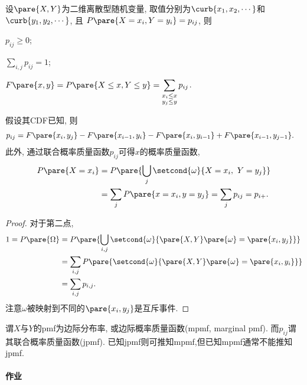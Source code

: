 \documentclass[../Statistics.tex]{subfiles}
\begin{document}
\begin{sample}
    \begin{ex}
        设$\pare{X,Y}$为二维离散型随机变量, 取值分别为$\curb{x_1,x_2,\cdots}$和$\curb{y_1,y_2,\cdots}$, 且
        $P\pare{X=x_i,Y=y_i} = p_{ij}$, 则
        \begin{cenum}
            \item $p_{ij} \ge 0$;
            \item $\displaystyle \sum_{i,j} p_{ij} = 1$;
            \item $F\pare{x,y} = P\pare{X\le x, Y\le y} = \displaystyle \sum_{\substack{x_i\le x\\ y_j\le y}} p_{ij}$.
        \end{cenum}
        假设其CDF已知, 则
        \begin{align*}
            p_{ij} &= F\pare{x_i, y_j} - F\pare{x_{i-1},y_i} - F\pare{x_i, y_{i-1}} + F\pare{x_{i-1},y_{j-1}}.
        \end{align*}
        此外, 通过联合概率质量函数$p_{ij}$可得$x$的概率质量函数,
        \begin{align*}
            P\pare{X=x_i} &= P\pare{\bigcup_{j} \setcond{\omega}{X = x_i,\ Y = y_j}} \\
            &= \sum_j P\pare{x = x_i, y = y_j} = \sum_j p_{ij} = p_{i+}.
        \end{align*}
    \end{ex}
    \begin{proof}
        对于第二点,
        \begin{align*}
            1 = P\pare{\Omega} &= P\pare{\bigcup_{i,j} \setcond{\omega}{\pare{X,Y}\pare{\omega} = \pare{x_i,y_j}}} \\
            &= \sum_{i,j} P\pare{\setcond{\omega}{\pare{X,Y}\pare{\omega} = \pare{x_i,y_i}}} \\
            &= \sum_{i,j} p_{i,j}.
        \end{align*}
        注意$\omega$被映射到不同的$\pare{x_i, y_j}$是互斥事件.
    \end{proof}
\end{sample}
谓$X$与$Y$的pmf为边际分布率, 或边际概率质量函数(mpmf, marginal pmf). 而$p_{ij}$谓其联合概率质量函数(jpmf). 已知jpmf则可推知mpmf,但已知mpmf通常不能推知jpmf.

\paragraph{作业} %
\label{par:作业}
\end{document}
